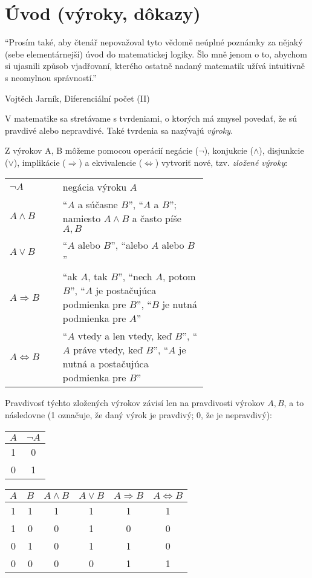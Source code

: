 \chapter*{Úvod (výroky, dôkazy)}

\epigraph{
  ``Prosím také, aby čtenář nepovažoval tyto vědomě neúplné poznámky za
nějaký (sebe elementárnejší) úvod do matematickej logiky. Šlo mně jenom o to,
abychom si ujasnili způsob vjadřovaní, kterého ostatně nadaný matematik užívá
intuitivně s neomylnou správností.''
}{Vojtěch Jarník, Diferenciální počet (II)}

V matematike sa stretávame s tvrdeniami, o ktorých má
zmysel povedať, že sú pravdivé alebo nepravdivé. Také tvrdenia sa nazývajú
\emph{výroky}.

Z výrokov A, B môžeme pomocou operácií negácie ($\neg$), konjukcie
($\land$), disjunkcie ($\lor$), implikácie ($\Rightarrow$) a ekvivalencie
($\iff$) vytvoriť nové, tzv. \emph{zložené výroky}:

\begin{center}
  \begin{tabular}{ m{0.15\linewidth} p{0.5\linewidth} }
    $\neg A$ & negácia výroku $A$ \\
    \bigskip
    $A \land B$
      & \enquote{$A$ a súčasne $B$},
        \enquote{$A$ a $B$};
        namiesto $A \land B$ a často píše $A, B$ \\
    \bigskip
    $A \lor B$
      & \enquote{$A$ alebo $B$},
        \enquote{alebo $A$ alebo $B$} \\
    \bigskip
    $A \Rightarrow B$
      & \enquote{ak $A$, tak $B$},
        \enquote{nech $A$, potom $B$},
        \enquote{$A$ je postačujúca podmienka pre $B$},
        \enquote{$B$ je nutná podmienka pre $A$} \\
    \bigskip
    $A \iff B$
      & \enquote{$A$ vtedy a len vtedy, keď $B$},
        \enquote{$A$ práve vtedy, keď $B$},
        \enquote{$A$ je nutná a postačujúca podmienka pre $B$} \\
  \end{tabular}
\end{center}

Pravdivosť týchto zložených výrokov závisí len na pravdivosti výrokov $A, B$,
a to následovne (1 označuje, že daný výrok je pravdivý; 0, že je nepravdivý):
\begin{center}
  \begin{tabular}{|c|c|}
    \hline
    $A$ & $\neg A$ \\
    \hline
    1 & 0 \\
    0 & 1 \\
    \hline
  \end{tabular}
  \quad
  \begin{tabular}{|c|c|c|c|c|c|}
    \hline
    $A$ & $B$ & $A \land B$ & $A \lor B$ & $A \Rightarrow B$ & $A \iff B$ \\
    \hline
    1 & 1 & 1 & 1 & 1 & 1 \\
    1 & 0 & 0 & 1 & 0 & 0 \\
    0 & 1 & 0 & 1 & 1 & 0 \\
    0 & 0 & 0 & 0 & 1 & 1 \\
    \hline
  \end{tabular}
\end{center}

